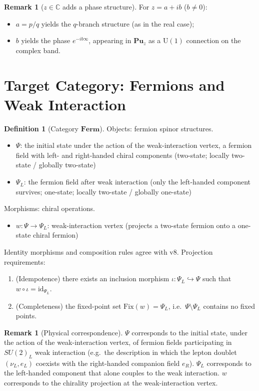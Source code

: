 \documentclass[11pt]{article}
\theoremstyle{plain}
\theoremstyle{definition}
\newtheorem{defn}[thm]{Definition}
\newtheorem{rem}[thm]{Remark}
\newcommand{\Cat}{\mathbf}
\begin{document}
\begin{rem}[$z\in\mathbb{C}$ adds a phase structure]\label{rem:complexcase}
For $z = a+ib$ ($b\neq 0$):
\begin{itemize}
\item $a = p/q$ yields the $q$-branch structure (as in the real case);
\item $b$ yields the phase $e^{-ib\infty}$, appearing in $\Cat{Pu}_z$ as a
$\mathrm{U}(1)$ connection on the complex band.
\end{itemize}
\end{rem}

\section{Target Category: Fermions and Weak Interaction}

\begin{defn}[Category $\Cat{Ferm}$]\label{def:ferm}
Objects: fermion spinor structures.
\begin{itemize}
\item $\Psi$: the initial state under the action of the weak-interaction
vertex, a fermion field with left- and right-handed chiral components
(two-state; locally two-state / globally two-state)
\item $\Psi_L$: the fermion field after weak interaction (only the
left-handed component survives; one-state; locally two-state / globally
one-state)
\end{itemize}
Morphisms: chiral operations.
\begin{itemize}
\item $w: \Psi \to \Psi_L$: weak-interaction vertex (projects a two-state
fermion onto a one-state chiral fermion)
\end{itemize}
Identity morphisms and composition rules agree with v8. Projection
requirements:
\begin{enumerate}
\item (Idempotence) there exists an inclusion morphism
$\iota: \Psi_L \hookrightarrow \Psi$ such that
$w\circ\iota = \mathrm{id}_{\Psi_L}$.
\item (Completeness) the fixed-point set $\mathrm{Fix}(w) = \Psi_L$,
i.e.\ $\Psi\setminus\Psi_L$ contains no fixed points.
\end{enumerate}
\end{defn}

\begin{rem}[Physical correspondence]\label{rem:physical}
$\Psi$ corresponds to the initial state, under the action of the
weak-interaction vertex, of fermion fields participating in $SU(2)_L$ weak
interaction (e.g.\ the description in which the lepton doublet
$(\nu_L,e_L)$ coexists with the right-handed companion field $e_R$).
$\Psi_L$ corresponds to the left-handed component that alone couples to the
weak interaction. $w$ corresponds to the chirality projection at the
weak-interaction vertex.
\end{rem}
\end{document}
